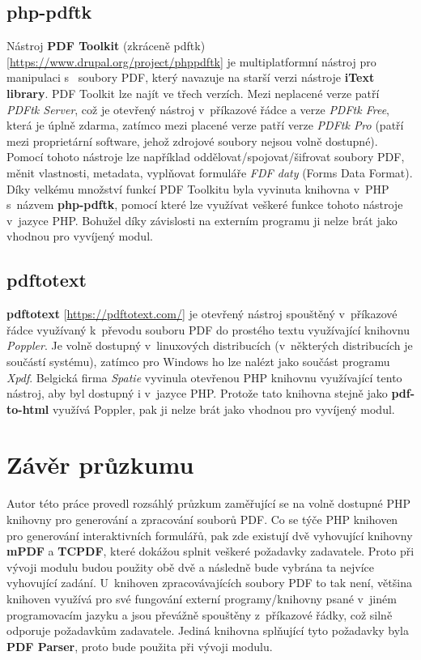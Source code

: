 \subsection{php-pdftk}
Nástroj \textbf{PDF Toolkit} (zkráceně pdftk) [\url{https://www.drupal.org/project/phppdftk}] je multiplatformní nástroj pro manipulaci s~ soubory PDF, který navazuje na starší verzi nástroje \textbf{iText library}. PDF Toolkit lze najít ve třech verzích. Mezi neplacené verze patří \textit{PDFtk Server}, což je otevřený nástroj v~příkazové řádce a verze \textit{PDFtk Free}, která je úplně zdarma, zatímco mezi placené verze patří verze \textit{PDFtk Pro} (patří mezi proprietární software, jehož zdrojové soubory nejsou volně dostupné). Pomocí tohoto nástroje lze například oddělovat/spojovat/šifrovat soubory PDF, měnit vlastnosti, metadata, vyplňovat formuláře \textit{FDF daty} (Forms Data Format). Díky velkému množství funkcí PDF Toolkitu byla vyvinuta knihovna v~PHP s~názvem \textbf{php-pdftk}, pomocí které lze využívat veškeré funkce tohoto nástroje v~jazyce PHP. Bohužel díky závislosti na externím programu ji nelze brát jako vhodnou pro vyvíjený modul.
\subsection{pdftotext}
\textbf{pdftotext} [\url{https://pdftotext.com/}] je otevřený nástroj spouštěný v~příkazové řádce využívaný k~převodu souboru PDF do prostého textu využívající knihovnu \textit{Poppler}. Je volně dostupný v~linuxových distribucích (v~některých distribucích je součástí systému), zatímco pro Windows ho lze nalézt jako součást programu \textit{Xpdf}. Belgická firma \textit{Spatie} vyvinula otevřenou PHP knihovnu využívající tento nástroj, aby byl dostupný i v~jazyce PHP. Protože tato knihovna stejně jako \textbf{pdf-to-html} využívá Poppler, pak ji nelze brát jako vhodnou pro vyvíjený modul.
\section{Závěr průzkumu}
Autor této práce provedl rozsáhlý průzkum zaměřující se na volně dostupné PHP knihovny pro generování a zpracování souborů PDF. Co se týče PHP knihoven pro generování interaktivních formulářů, pak zde existují  dvě vyhovující knihovny \textbf{mPDF} a \textbf{TCPDF}, které dokážou splnit veškeré požadavky zadavatele. Proto při vývoji modulu budou použity obě dvě a následně bude vybrána ta nejvíce vyhovující zadání. U~knihoven zpracovávajících soubory PDF to tak není, většina knihoven využívá pro své fungování externí programy/knihovny psané v~jiném programovacím jazyku a jsou převážně spouštěny z~příkazové řádky, což silně odporuje požadavkům zadavatele. Jediná knihovna splňující tyto požadavky byla \textbf{PDF Parser}, proto bude použita při vývoji modulu. 